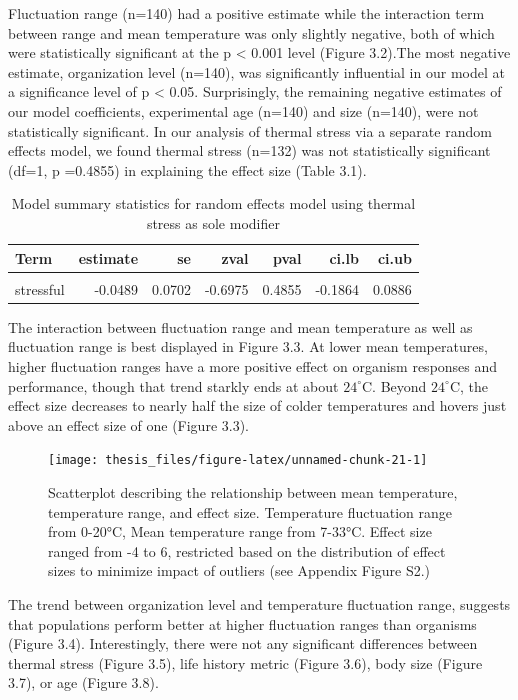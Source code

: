 \documentclass[12pt,twoside]{reedthesis}
\begin{document}
Fluctuation range (n=140) had a positive estimate while the interaction term between range and mean temperature was only slightly negative, both of which were statistically significant at the p \textless{} 0.001 level (Figure 3.2).The most negative estimate, organization level (n=140), was significantly influential in our model at a significance level of p \textless{} 0.05. Surprisingly, the remaining negative estimates of our model coefficients, experimental age (n=140) and size (n=140), were not statistically significant. In our analysis of thermal stress via a separate random effects model, we found thermal stress (n=132) was not statistically significant (df=1, p =0.4855) in explaining the effect size (Table 3.1).
\begin{table}[!h]

\caption[Thermal stress model summary statistics]{\label{tab:unnamed-chunk-20}Model summary statistics for random effects model using thermal stress as sole modifier}
\centering
\begin{tabular}[t]{lrrrrrr}
\toprule
\textbf{Term} & \textbf{estimate} & \textbf{se} & \textbf{zval} & \textbf{pval} & \textbf{ci.lb} & \textbf{ci.ub}\\
\midrule
\cellcolor{gray!6}{intercept} & \cellcolor{gray!6}{0.2050} & \cellcolor{gray!6}{0.1846} & \cellcolor{gray!6}{1.1104} & \cellcolor{gray!6}{0.2668} & \cellcolor{gray!6}{-0.1568} & \cellcolor{gray!6}{0.5669}\\
stressful & -0.0489 & 0.0702 & -0.6975 & 0.4855 & -0.1864 & 0.0886\\
\bottomrule
\end{tabular}
\end{table}
\clearpage

The interaction between fluctuation range and mean temperature as well as fluctuation range is best displayed in Figure 3.3. At lower mean temperatures, higher fluctuation ranges have a more positive effect on organism responses and performance, though that trend starkly ends at about \(24^{\circ}\)C. Beyond \(24^{\circ}\)C, the effect size decreases to nearly half the size of colder temperatures and hovers just above an effect size of one (Figure 3.3).
\begin{figure}

{\centering \texttt{[image: thesis\_files/figure-latex/unnamed-chunk-21-1]} 

}

\caption[Scatterplot of relationship between range, mean, and effect size]{Scatterplot describing the relationship between mean temperature, temperature range, and effect size. Temperature fluctuation range from 0-20°C, Mean temperature range from 7-33°C. Effect size ranged from -4 to 6, restricted based on the distribution of effect sizes to minimize impact of outliers (see Appendix Figure S2.)}\label{fig:unnamed-chunk-21}
\end{figure}
The trend between organization level and temperature fluctuation range, suggests that populations perform better at higher fluctuation ranges than organisms (Figure 3.4). Interestingly, there were not any significant differences between thermal stress (Figure 3.5), life history metric (Figure 3.6), body size (Figure 3.7), or age (Figure 3.8).
\end{document}
